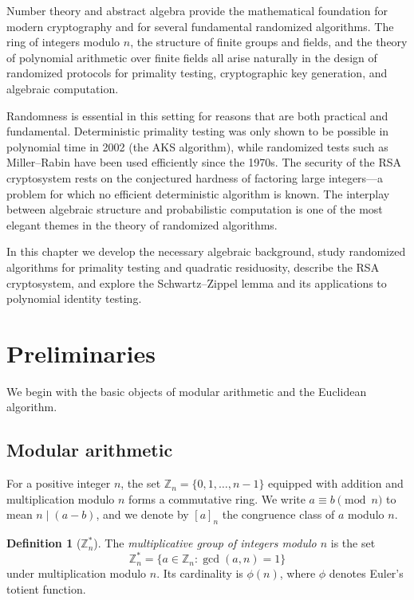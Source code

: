 \documentclass[twoside,12pt]{book}
\theoremstyle{plain}
\theoremstyle{definition}
\newtheorem{definition}[theorem]{Definition}
\theoremstyle{remark}
\begin{document}
Number theory and abstract algebra provide the mathematical foundation for modern cryptography and for several fundamental randomized algorithms. The ring of integers modulo $n$, the structure of finite groups and fields, and the theory of polynomial arithmetic over finite fields all arise naturally in the design of randomized protocols for primality testing, cryptographic key generation, and algebraic computation.

Randomness is essential in this setting for reasons that are both practical and fundamental. Deterministic primality testing was only shown to be possible in polynomial time in 2002 (the AKS algorithm), while randomized tests such as Miller--Rabin have been used efficiently since the 1970s. The security of the RSA cryptosystem rests on the conjectured hardness of factoring large integers---a problem for which no efficient deterministic algorithm is known. The interplay between algebraic structure and probabilistic computation is one of the most elegant themes in the theory of randomized algorithms.

In this chapter we develop the necessary algebraic background, study randomized algorithms for primality testing and quadratic residuosity, describe the RSA cryptosystem, and explore the Schwartz--Zippel lemma and its applications to polynomial identity testing.

\section{Preliminaries}
\label{sec:number-theory-prelim}

We begin with the basic objects of modular arithmetic and the Euclidean algorithm.

\subsection{Modular arithmetic}

For a positive integer $n$, the set $\mathbb{Z}_n = \{0, 1, \ldots, n-1\}$ equipped with addition and multiplication modulo $n$ forms a commutative ring. We write $a \equiv b \pmod{n}$ to mean $n \mid (a - b)$, and we denote by $[a]_n$ the congruence class of $a$ modulo $n$.

\begin{definition}[$\mathbb{Z}_n^*$]
The \emph{multiplicative group of integers modulo $n$} is the set
\[
\mathbb{Z}_n^* = \{a \in \mathbb{Z}_n : \gcd(a, n) = 1\}
\]
under multiplication modulo $n$. Its cardinality is $\phi(n)$, where $\phi$ denotes Euler's totient function.
\end{definition}
\end{document}
